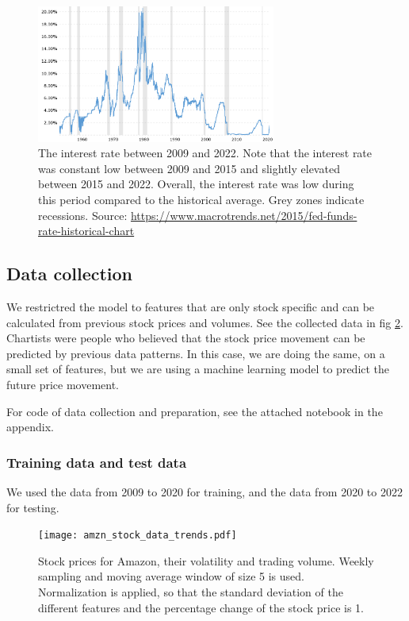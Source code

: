 \documentclass{article}
\begin{document}
\begin{figure}[h]
    \centering
    \includegraphics[width=0.7\textwidth]{IR.png}
    \caption{The interest rate between 2009 and 2022. Note that
        the interest rate was constant low between 2009 and 2015
        and slightly elevated between 2015 and 2022. Overall,
        the interest rate was low during this period compared
        to the historical average. Grey zones indicate recessions.
        Source: \url{https://www.macrotrends.net/2015/fed-funds-rate-historical-chart}}
    \label{fig:interest}
\end{figure}


\subsection{Data collection}
We restrictred the model to features that are only stock specific and can be calculated from
previous stock prices and volumes. See the collected data in fig \ref{fig:amazon_scaled_data}.
Chartists were people who believed that
the stock price movement can be predicted by previous data patterns.
In this case, we are doing the same, on a small set of features,
but we are using a machine learning model to predict the future price movement.

For code of data collection and preparation, see the attached notebook in the appendix.

\subsubsection{Training data and test data}
We used the data from 2009 to 2020 for training, and the data from 2020 to 2022 for testing.

\begin{figure}[ht]
    \centering
    \texttt{[image: amzn\_stock\_data\_trends.pdf]}
    \caption{Stock prices for Amazon, their volatility and trading volume.
        Weekly sampling and moving average window of size 5 is used.
        Normalization is applied, so that the standard deviation of the
        different features and the percentage change of the stock price
        is 1.}
    \label{fig:amazon_scaled_data}
\end{figure}
\end{document}
